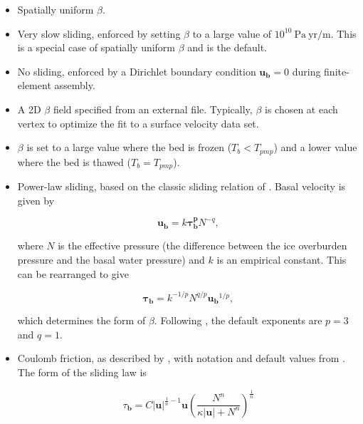 \begin{itemize}

\item Spatially uniform $\beta$.

\item Very slow sliding, enforced by setting $\beta$ to a large value of $10^{10}~\mathrm{Pa~yr/m}$.  
This is a special case of spatially uniform $\beta$ and is the default.

\item No sliding, enforced by a Dirichlet boundary condition $\mathbf{u_b} = 0$
during finite-element assembly.

\item A 2D $\beta$ field specified from an external file. Typically, $\beta$ is chosen
at each vertex to optimize the fit to a surface velocity data set.

\item $\beta$ is set to a large value where the bed is frozen ($T_b < T_{pmp}$) and a lower value
where the bed is thawed ($T_b = T_{pmp}$).

\item Power-law sliding, based on the classic sliding relation of \citet{Weertman1957}.
Basal velocity is given by

\begin{equation}
  \label{gliss.eq.power_law_sliding}
  \mathbf{u_b} = k \mathbf{\tau_b^p} N^{-q},
\end{equation}

\noindent
where $N$ is the effective pressure (the difference between the ice overburden pressure and
the basal water pressure) and $k$ is an empirical constant.
This can be rearranged to give

\begin{equation}
  \label{gliss.eq.power_law_sliding2}
  \mathbf{\tau_b} = k^{-1/p} N^{q/p} \mathbf{u_b}^{1/p}, 
\end{equation}

\noindent
which determines the form of $\beta$.
Following \citet{Cuffey2010}, the default exponents are $p = 3$ and $q = 1$.

\item Coulomb friction, as described by \citet{Schoof2005}, with notation
and default values from \citet{Pimentel2010a}. The form of the sliding law is

\begin{equation}
  \label{gliss.eq.power_law_schoof}
        {{\tau }_{\mathbf{b}}} = C{{\left| \mathbf{u} \right|}^{\frac{1}{n}-1}}\mathbf{u}{{\left( \frac{{{N}^{n}}}{\kappa \left| \mathbf{u} \right|+{{N}^{n}}} \right)}^{\frac{1}{n}}}
\end{equation}


\end{itemize}
